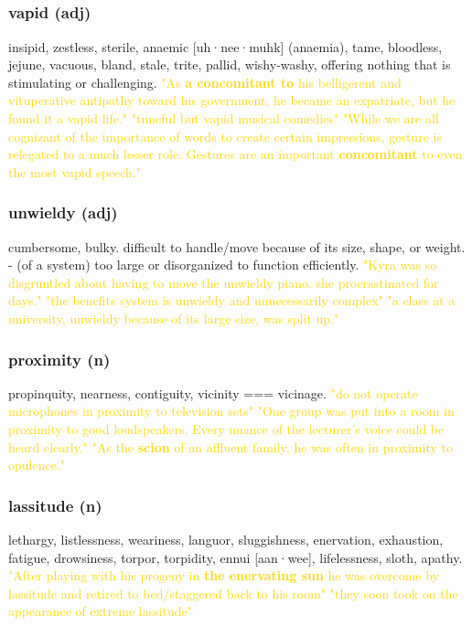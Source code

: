 \documentclass{proc}
\begin{document}
	\newpage
	\subsection{}
	\subsubsection{\textcolor{brickred}{vapid} (adj)}
	insipid, zestless, sterile,
	anaemic [uh·nee·muhk] (anaemia),
	tame,
	bloodless,
	jejune,
	vacuous,
	bland,
	stale,
	trite,
	pallid,
	wishy-washy, offering nothing that is stimulating or challenging.
	\textcolor{gold}{"As \textbf{a concomitant to} his belligerent and vituperative antipathy toward his government. he became an expatriate, but he found it a vapid life." "tuneful but vapid musical comedies" "While we are all cognizant of the importance of words to create certain impressions, gesture is  relegated  to  a  much lesser role. Gestures are an  important \textbf{concomitant} to even the most vapid speech."}
	
	\subsubsection{\textcolor{brickred}{unwieldy} (adj)}
	cumbersome, bulky. difficult to handle/move because of its size, shape, or weight. - (of a system) too large or disorganized to function efficiently.
	\textcolor{gold}{"Kyra was so disgruntled about having to move the unwieldy piano. she procrastinated for days." "the benefits system is unwieldy and unnecessarily complex" "a class at a university, unwieldy because of its large size, was split up."}
	
	\subsubsection{\textcolor{brickred}{proximity} (n)}
	propinquity, nearness, contiguity,
	vicinity === vicinage.
	\textcolor{gold}{"do not operate microphones in proximity to television sets" "One group was put into a room in proximity to good loudspeakers. Every nuance of the lecturer's voice could be heard clearly." "As the \textbf{scion} of  an  affluent family, he was often in proximity to opulence."}
	
	\subsubsection{\textcolor{brickred}{lassitude} (n)}
	lethargy,
	listlessness,
	weariness,
	languor,
	sluggishness,
	enervation,
	exhaustion,
	fatigue,
	drowsiness,
	torpor,
	torpidity,
	ennui [aan·wee],
	lifelessness,
	sloth,
	apathy. 
	\textcolor{gold}{"After playing with his progeny in \textbf{the enervating sun} he was overcome by lassitude and retired to bed/staggered back to his room" "they soon  took  on the appearance of  extreme lassitude"}
	
\end{document}
